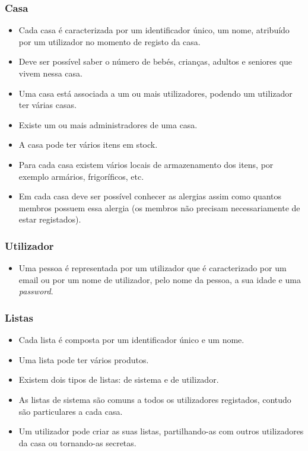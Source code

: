 \subsubsection{Casa}
\begin{itemize}
	\item Cada casa é caracterizada por um identificador único, um nome, atribuído por um utilizador no momento de registo da casa. 
	\item Deve ser possível saber o número de bebés, crianças, adultos e seniores que vivem nessa casa.
	\item Uma casa está associada a um ou mais utilizadores, podendo um utilizador ter várias casas. 
	\item Existe um ou mais administradores de uma casa.
	\item A casa pode ter vários itens em stock.
	\item Para cada casa existem vários locais de armazenamento dos itens, por exemplo armários, frigoríficos, etc.
	\item Em cada casa deve ser possível conhecer as alergias assim como quantos membros possuem essa alergia (os membros não precisam necessariamente de estar registados).
\end{itemize}

\subsubsection{Utilizador}
\begin{itemize}
	\item Uma pessoa é representada por um utilizador que é caracterizado por um email ou por um nome de utilizador, pelo nome da pessoa, a sua idade e uma \textit{password}.
\end{itemize}

\subsubsection{Listas}
\begin{itemize}
	\item Cada lista é composta por um identificador único e um nome.
	\item Uma lista pode ter vários produtos.
	\item Existem dois tipos de listas: de sistema e de utilizador. 
	\item As listas de sistema são comuns a todos os utilizadores registados, contudo são particulares a cada casa.	
	\item Um utilizador pode criar as suas listas, partilhando-as com outros utilizadores da casa ou tornando-as secretas.
\end{itemize}

